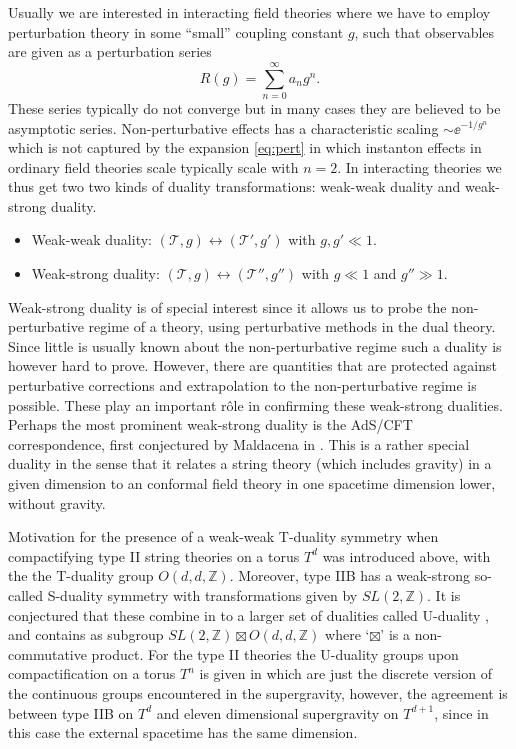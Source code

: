 Usually we are interested in interacting field theories where we have to employ perturbation theory in some ``small'' coupling constant $g$, such that observables are given as a perturbation series
\begin{equation}\label{eq:pert}
    R(g) = \sum_{n=0}^{\infty}a_n g^n.
\end{equation}
These series typically do not converge but in many cases they are believed to be asymptotic series. Non-perturbative effects has a characteristic scaling $\sim \ee^{-1/g^n}$ which is not captured by the expansion \eqref{eq:pert} in which instanton effects in ordinary field theories scale typically scale with $n=2$. In interacting theories we thus get two two kinds of duality transformations: weak-weak duality and weak-strong duality. 
\begin{itemize}
    \item Weak-weak duality: $\left(\mathscr{T},g\right)\leftrightarrow\left(\mathscr{T}',g'\right)$ with $g,g'\ll 1$.
    \item Weak-strong duality: $\left(\mathscr{T},g\right)\leftrightarrow\left(\mathscr{T}'',g''\right)$ with $g\ll 1$ and $g''\gg 1$.
\end{itemize}
Weak-strong duality is of special interest since it allows us to probe the non-perturbative regime of a theory, using perturbative methods in the dual theory. Since little is usually known about the non-perturbative regime such a duality is however hard to prove. However, there are quantities that are protected against perturbative corrections and extrapolation to the non-perturbative regime is possible. These play an important rôle in confirming these weak-strong dualities. Perhaps the most prominent weak-strong duality is the AdS/CFT correspondence, first conjectured by Maldacena in \cite{Maldacena1999}. This is a rather special duality in the sense that it relates a string theory (which includes gravity) in a given dimension to an conformal field theory in one spacetime dimension lower, without gravity. 

Motivation for the presence of a weak-weak T-duality symmetry when compactifying type II string theories on a torus $T^d$ was introduced above, with the the T-duality group $O(d,d,\mathbb{Z})$. Moreover, type IIB has a weak-strong so-called S-duality symmetry with transformations given by $SL(2,\mathbb{Z})$. It is conjectured that these combine in to a larger set of dualities called U-duality \cite{Hull:1994ys}, and contains as subgroup $ SL(2,\mathbb{Z})\boxtimes O(d,d,\mathbb{Z})$ where `$\boxtimes$' is a non-commutative product. For the type II theories the U-duality groups upon compactification on a torus $T^{n}$ is given in  which are just the discrete version of the continuous groups encountered in the supergravity, however, the agreement is between type IIB on $T^{d}$ and eleven dimensional supergravity on $T^{d+1}$, since in this case the external spacetime has the same dimension. 

